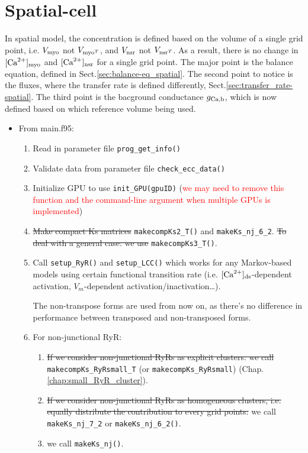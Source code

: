 \chapter{Spatial-cell}
\label{chap:spatial-cell}

In spatial model, the concentration is defined based on the volume of a single
grid point, i.e. $V_{\text{myo}}$ not $V_{\text{myo}^T}$, and $V_{\text{nsr}}$ not $V_{\text{nsr}^T}$. As a
result, there is no change in $[{\text{Ca}^{2+}}]_{\text{myo}}$ and $[{\text{Ca}^{2+}}]_{\text{nsr}}$ for a single grid
point. The major point is the balance equation, defined in
Sect.\ref{sec:balance-eq_spatial}. The second point to notice is the fluxes,
where the transfer rate is defined differently,
Sect.\ref{sec:transfer_rate-spatial}. The third point is the bacground
conductance $g_{\text{Ca,b}}$, which is now defined based on which reference volume being
used.

\begin{itemize}
  \item From main.f95:
\begin{enumerate}
\item Read in parameter file \verb!prog_get_info()! 
\item Validate data from parameter file \verb!check_ecc_data()! 
\item Initialize GPU to use \verb!init_GPU(gpuID)! 
  (\textcolor{red}{we may need to remove this function and the
    command-line argument when multiple GPUs is implemented})
    
\item \sout{Make compact Ks matrices} \verb!makecompKs2_T()! and
\verb!makeKs_nj_6_2!. \sout{To deal with a general case: we use}
\verb!makecompKs3_T()!.
 
\item Call \verb!setup_RyR()! and \verb!setup_LCC()! which works for any 
Markov-based models using certain functional transition rate (i.e.
$[{\text{Ca}^{2+}}]_{\text{ds}}$-dependent activation, $V_m$-dependent
activation/inactivation\ldots).

\begin{framed}
The non-transpose forms are used from now on, as there's no difference in
performance between transposed and non-transposed forms.
\end{framed}

\item For non-junctional RyR:
\begin{enumerate}
  \item \sout{If we consider non-junctional RyRs as explicit clusters: we call}
  \verb!makecompKs_RyRsmall_T! (or \verb!makecompKs_RyRsmall!)
  (Chap.\ref{chap:small_RyR_cluster}).
  \item \sout{If we consider non-junctional RyRs as homogeneous clusters, i.e.
  equally distribute the contribution to every grid points:}
  we call \verb!makeKs_nj_7_2! or \verb!makeKs_nj_6_2()!.
  \item we call \verb!makeKs_nj()!. 
\end{enumerate}
   

\end{enumerate}
\end{itemize}
